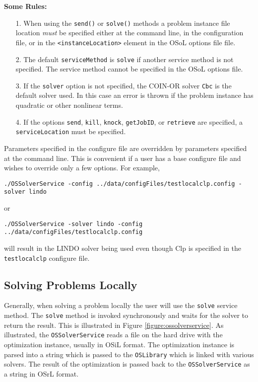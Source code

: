 \documentclass[11pt]{article}
\newcounter{Fig}
\renewcommand{\_}{{\char"5F}}
\renewcommand{\{}{{\char"7B}}
\renewcommand{\}}{{\char"7D}}
\renewcommand{\^}{{\char"0D}}
\renewcommand{\'}{{\char"0D}}
\begin{document}
{\bf Some Rules:}

\begin{itemize}
\item[1.]  When using the {\tt send()} or  {\tt solve()} methods a problem instance file location {\it must} be specified either at  the command line, in the configuration file, or in the {\tt <instanceLocation>} element in the OSoL options file file.

\item[2.]  The default {\tt serviceMethod} is {\tt solve} if another service method is not specified.   The service method cannot be specified in the OSoL options file. 

\item [3.]  If the {\tt solver} option is not specified, the COIN-OR solver {\tt Cbc} is the default solver used. In this case an error is thrown if the problem instance has quadratic or other nonlinear terms. 

\item[4.]  If the options {\tt send}, {\tt kill}, {\tt knock},  {\tt getJobID},  or {\tt retrieve} are specified, a  {\tt serviceLocation} must be specified. 

\end{itemize}



Parameters specified in the configure file are overridden by parameters specified at the command line. This is convenient if a user has a base configure file and wishes to override only a few options. For example,
\begin{verbatim}
./OSSolverService -config ../data/configFiles/testlocalclp.config -solver lindo
\end{verbatim}
or
\begin{verbatim}
./OSSolverService -solver lindo -config ../data/configFiles/testlocalclp.config 
\end{verbatim}
will result in the LINDO solver being used even though Clp is specified in the {\tt testlocalclp} configure file.



\subsection{Solving Problems Locally}

Generally, when solving a problem locally the user will use the {\tt solve} service method. The {\tt solve} method is invoked synchronously and waits for the solver to return the result.  This is illustrated in Figure \ref{figure:ossolverservice}. As illustrated, the {\tt OSSolverService} reads a file on the hard drive with the optimization instance, usually in OSiL format. The optimization instance is parsed into a string which is passed to the {\tt OSLibrary} which is linked with various solvers. The result of the optimization is passed back to the {\tt OSSolverService} as a string in OSrL format.  
\end{document}
